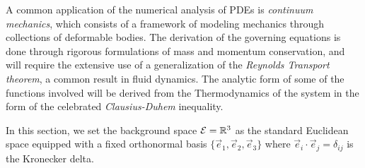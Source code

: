 A common application of the numerical analysis of PDEs is \emph{continuum mechanics}, which consists of a framework of modeling mechanics through collections of deformable bodies. The derivation of the governing equations is done through rigorous formulations of mass and momentum conservation, and will require the extensive use of a generalization of the \emph{Reynolds Transport theorem}, a common result in fluid dynamics. The analytic form of some of the functions involved will be derived from the Thermodynamics of the system in the form of the celebrated \emph{Clausius-Duhem} inequality. 

In this section, we set the background space $\mathcal{E} = \mathbb{R}^3$ as the standard Euclidean space equipped with a fixed orthonormal basis $\{\vec e_1, \vec e_2, \vec e_3\}$ where $\vec e_i\cdot\vec e_j = \delta_{ij}$ is the Kronecker delta.


